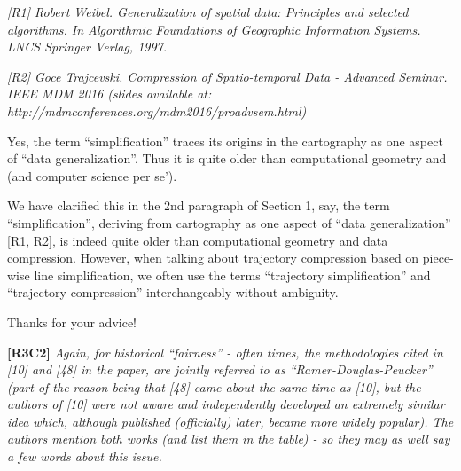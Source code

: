 \documentclass{letter}
\begin{document}
\emph{[R1] Robert Weibel. Generalization of spatial data: Principles and selected algorithms. In Algorithmic Foundations of Geographic Information Systems. LNCS Springer Verlag, 1997.}


\emph{[R2] Goce Trajcevski. Compression of Spatio-temporal Data - Advanced Seminar. IEEE MDM 2016 (slides available at: http://mdmconferences.org/mdm2016/proadvsem.html)}


Yes, the term ``simplification'' traces its origins in the cartography as one aspect of ``data generalization''. Thus it is quite older than computational geometry and (and computer science per se'). 

We have clarified this in the 2nd paragraph of Section 1, say, the term ``simplification'', deriving from cartography as one aspect of ``data generalization'' [R1, R2], is indeed quite older than computational geometry and data compression. However, when talking about trajectory compression based on piece-wise line simplification, we often use the terms ``trajectory simplification'' and ``trajectory compression'' interchangeably without ambiguity.
 
Thanks for your advice!


\textbf{[R3C2]} \emph{Again, for historical ``fairness'' - often times, the methodologies cited in [10] and [48] in the paper, are jointly referred to as ``Ramer-Douglas-Peucker'' (part of the reason being that [48] came about the same time as [10], but the authors of [10] were not aware and independently developed an extremely similar idea which, although published (officially) later, became more widely popular). The authors mention both works (and list them in the table) - so they may as well say a few words about this issue.}
\end{document}
